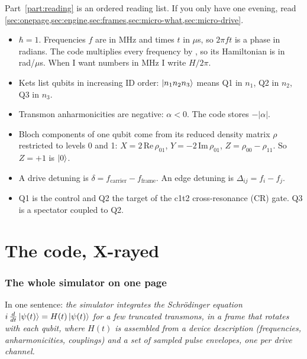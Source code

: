 \documentclass[11pt,a4paper]{article}
\DeclareRobustCommand{\code}[1]{\texttt{\detokenize{#1}}}
\begin{document}
Part~\ref{part:reading} is an ordered reading list. If you only have one evening, read
\cref{sec:onepage,sec:engine,sec:frames,sec:micro-what,sec:micro-drive}.

\begin{keybox}
\begin{itemize}
\item \(\hbar = 1\). Frequencies \(f\) are in MHz and times \(t\) in \(\mu\)s, so \(2\pi f t\) is a phase in radians.
  The code multiplies every frequency by \code{TWOPI}, so its Hamiltonian is in rad/\(\mu\)s. When I want numbers in MHz I
  write \(H/2\pi\).
\item Kets list qubits in increasing ID order: \(\ket{n_1 n_2 n_3}\) means Q1 in \(n_1\), Q2 in \(n_2\), Q3 in \(n_3\).
\item Transmon anharmonicities are negative: \(\alpha < 0\). The code stores \(-|\alpha|\).
\item Bloch components of one qubit come from its reduced density matrix \(\rho\) restricted to levels 0 and 1:
  \(X = 2\,\mathrm{Re}\,\rho_{01}\), \(Y = -2\,\mathrm{Im}\,\rho_{01}\), \(Z = \rho_{00} - \rho_{11}\). So \(Z=+1\) is \(\ket{0}\).
\item A drive detuning is \(\delta = f_{\text{carrier}} - f_{\text{frame}}\). An edge detuning is
  \(\Delta_{ij} = f_i - f_j\).
\item Q1 is the control and Q2 the target of the c1t2 cross-resonance (CR) gate. Q3 is a spectator coupled to Q2.
\end{itemize}
\end{keybox}

\part{The code, X-rayed}\label{part:code}

\section{The whole simulator on one page}\label{sec:onepage}

In one sentence: \emph{the simulator integrates the Schr\"odinger equation
\(i\,\tfrac{d}{dt}\ket{\psi(t)} = H(t)\ket{\psi(t)}\) for a few truncated transmons, in a frame that rotates with each
qubit, where \(H(t)\) is assembled from a device description (frequencies, anharmonicities, couplings) and a set of
sampled pulse envelopes, one per drive channel.}
\end{document}
